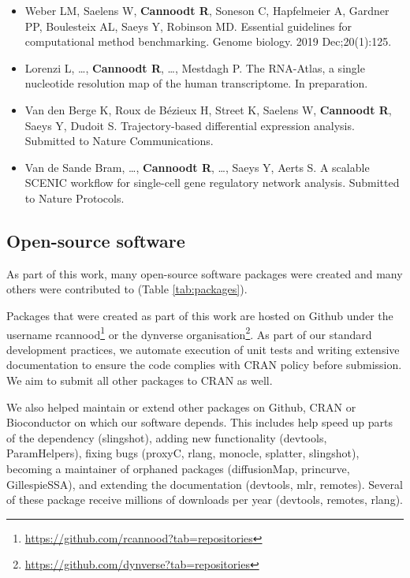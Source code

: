 \begin{itemize}
  \item Weber LM, Saelens W, \textbf{Cannoodt R}, Soneson C, Hapfelmeier A, Gardner PP, Boulesteix AL, Saeys Y, Robinson MD. Essential guidelines for computational method benchmarking. Genome biology. 2019 Dec;20(1):125.
  \item Lorenzi L, \ldots, \textbf{Cannoodt R}, \ldots, Mestdagh P. The RNA-Atlas, a single nucleotide resolution map of the human transcriptome. In preparation.
  \item Van den Berge K, Roux de Bézieux H, Street K, Saelens W, \textbf{Cannoodt R}, Saeys Y, Dudoit S. Trajectory-based differential expression analysis. Submitted to Nature Communications.
  \item Van de Sande Bram, \ldots, \textbf{Cannoodt R}, \ldots, Saeys Y, Aerts S. A scalable SCENIC workflow for single-cell gene regulatory network analysis. Submitted to Nature Protocols.
\end{itemize}

\subsection{Open-source software}
As part of this work, many open-source software packages were created and many others were contributed to (Table \ref{tab:packages}). 

Packages that were created as part of this work are hosted on Github under the username rcannood\footnote{\url{https://github.com/rcannood?tab=repositories}} or the dynverse organisation\footnote{\url{https://github.com/dynverse?tab=repositories}}. As part of our standard development practices, we automate execution of unit tests and writing extensive documentation to ensure the code complies with CRAN policy before submission. We aim to submit all other packages to CRAN as well.

We also helped maintain or extend other packages on Github, CRAN or Bioconductor on which our software depends. This includes help speed up parts of the dependency (slingshot), adding new functionality (devtools, ParamHelpers), fixing bugs (proxyC, rlang, monocle, splatter, slingshot), becoming a maintainer of orphaned packages (diffusionMap, princurve, GillespieSSA), and extending the documentation (devtools, mlr, remotes). Several of these package receive millions of downloads per year (devtools, remotes, rlang).

\newcommand{\cranpkg}[1]{\href{https://cran.r-project.org/package=#1}{#1}}
\newcommand{\biocpkg}[1]{\href{https://bioconductor.org/packages/#1}{#1}}
\newcommand{\biocpkgl}[2]{\href{https://bioconductor.org/packages/#1}{#2}}
\newcommand{\githubpkg}[2]{\href{https://github.com/#1/#2}{#2}}
\newcommand{\notavailable}{}

